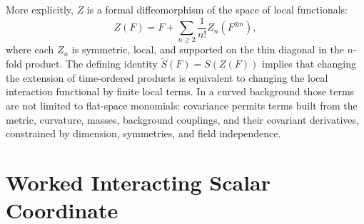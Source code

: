 More explicitly, \(Z\) is a formal diffeomorphism of the space of local
functionals:
\begin{equation}
  Z(F)
  =
  F+
  \sum_{n\ge2}\frac1{n!}Z_n(F^{\otimes n}),
  \label{eq:paqft-z-expansion}
\end{equation}
where each \(Z_n\) is symmetric, local, and supported on the thin diagonal in
the \(n\)-fold product.  The defining identity
\(\widetilde S(F)=S(Z(F))\) implies that changing the extension of
time-ordered products is equivalent to changing the local interaction
functional by finite local terms.  In a curved background those terms are
not limited to flat-space monomials: covariance permits terms built from the
metric, curvature, masses, background couplings, and their covariant
derivatives, constrained by dimension, symmetries, and field independence.

\section{Worked Interacting Scalar Coordinate}
\label{sec:paqft-worked-interacting-scalar-coordinate}

